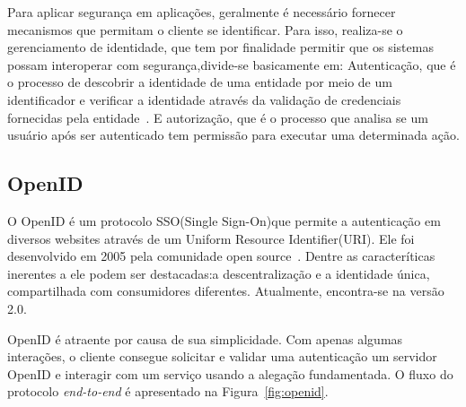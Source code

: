 Para aplicar segurança em aplicações, geralmente é necessário fornecer mecanismos que permitam o cliente se identificar. Para isso, realiza-se o gerenciamento de identidade, que tem por finalidade permitir que os sistemas possam interoperar com segurança,divide-se basicamente em: Autenticação, que é o processo de descobrir a identidade de uma entidade por meio de um identificador e verificar a identidade através da validação de credenciais fornecidas pela entidade~\cite{lakshmiraghavan2013pro}. E autorização, que é o processo que analisa se um usuário após ser autenticado tem permissão para executar uma determinada ação.%



\subsection{OpenID}

O OpenID é um protocolo SSO(Single Sign-On)que permite a autenticação em diversos websites através de um Uniform Resource Identifier(URI). Ele foi desenvolvido em 2005 pela comunidade open source~\cite{Recordon2006}. Dentre as caracteríticas inerentes a ele podem ser destacadas:a descentralização e a identidade única, compartilhada com consumidores diferentes. Atualmente, encontra-se na versão 2.0.

OpenID é atraente por causa de sua simplicidade. Com apenas algumas interações, o cliente consegue solicitar e validar  uma autenticação um servidor OpenID e interagir com um serviço usando a alegação fundamentada. O fluxo do protocolo \emph{end-to-end} é apresentado na Figura~\ref{fig:openid}.


